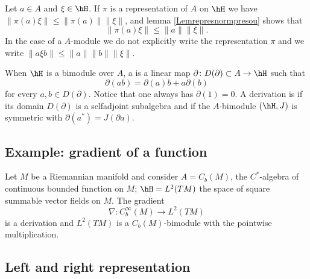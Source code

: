 Let \(a\in A\) and \(\xi\in \hH\). If \(\pi\) is a representation of \(A\) on \(\hH\) we have \(\| \pi(a)\xi \|\leq\| \pi(a) \|\| \xi \|\), and lemma \ref{Lemrepresnormpresou} shows that
\begin{equation}        \label{Eqpiaxileqanormxi}
    \| \pi(a)\xi \|\leq \| a \|\| \xi \|.
\end{equation}
In the case of a \(A\)-module we do not explicitly write the representation \(\pi\) and we write \(\| a \xi b\|\leq\| a \|\| b \|\| \xi \|\).

When $\hH$ is a bimodule over $A$, a  is a linear map $\partial\colon D(\partial)\subset A\to \hH$ such that
\begin{equation}
	\partial(ab)=\partial(a)b+a\partial(b)
\end{equation}
for every $a,b\in D(\partial)$. Notice that one always has \(\partial(1)=0\). A derivation is  if its domain $D(\partial)$ is a selfadjoint subalgebra and if the $A$-bimodule $(\hH,J)$ is symmetric with $\partial(a^*)=J(\partial a)$.

\subsection{Example: gradient of a function}

Let $M$ be a Riemannian manifold and consider $A=C_b(M)$, the $C^*$-algebra of continuous bounded function on $M$; $\hH=L^2(TM)$ the space of square summable vector fields on $M$. The gradient
\begin{equation}
	\nabla\colon C^{\infty}_b(M)\to L^2(TM)
\end{equation}
is a derivation and $L^2(TM)$ is a $C_b(M)$-bimodule with the pointwise multiplication.

\subsection{Left and right representation}

